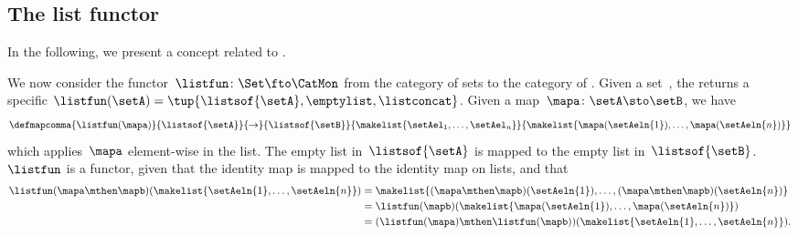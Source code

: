 \subsection{The list functor}
In the following, we present a concept related to .

We now consider the functor~$\listfun\colon \Set \fto \CatMon$ from the category of sets to the category of .
Given a set~\setA, the  returns a specific  $\listfun(\setA)=\tup{\listsof{\setA},\emptylist, \listconcat}$.
Given a map~$\mapa\colon \setA \sto \setB$, we have
\begin{equation}
    \defmapcomma{
        \listfun(\mapa)
    }{
        \listsof{\setA}
    }{
        \to
    }{
        \listsof{\setB}
    }{
        \makelist{\setAel_1, \ldots, \setAel_n}
    }{
        \makelist{\mapa(\setAeln{1}), \ldots, \mapa(\setAeln{n})}
    }
\end{equation}
which applies~$\mapa$ element-wise in the list.
The empty list in~$\listsof{\setA}$ is mapped to the empty list in~$\listsof{\setB}$.
    {}
$\listfun$ is a functor, given that the identity map is mapped to the identity map on lists, and that
\begin{equation}
    \begin{aligned}
        \listfun(\mapa \mthen \mapb)(\makelist{\setAeln{1},\ldots,\setAeln{n}}) & =\makelist{(\mapa \mthen \mapb)(\setAeln{1}), \ldots, (\mapa \mthen \mapb)(\setAeln{n})} \\
                                                                                & =\listfun(\mapb)(\makelist{\mapa(\setAeln{1}), \ldots, \mapa(\setAeln{n})}) \\
                                                                                & =(\listfun(\mapa)\mthen \listfun(\mapb))(\makelist{\setAeln{1}, \ldots, \setAeln{n}}).
    \end{aligned}
\end{equation}


